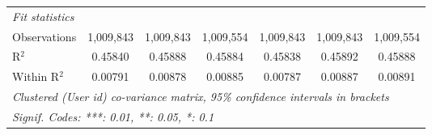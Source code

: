 \begin{table}[htbp]
\begin{threeparttable}[b]
\begin{tabular}{lcccccc}
         \emph{Fit statistics}\\
         Observations                   & 1,009,843       & 1,009,843       & 1,009,554       & 1,009,843        & 1,009,843        & 1,009,554\\  
         R$^2$                          & 0.45840         & 0.45888         & 0.45884         & 0.45838          & 0.45892          & 0.45888\\  
         Within R$^2$                   & 0.00791         & 0.00878         & 0.00885         & 0.00787          & 0.00887          & 0.00891\\  
         \midrule \midrule
         \multicolumn{7}{l}{\emph{Clustered (User id) co-variance matrix, 95\% confidence intervals in brackets}}\\
         \multicolumn{7}{l}{\emph{Signif. Codes: ***: 0.01, **: 0.05, *: 0.1}}\\
      \end{tabular}
   \end{threeparttable}
\end{table}


